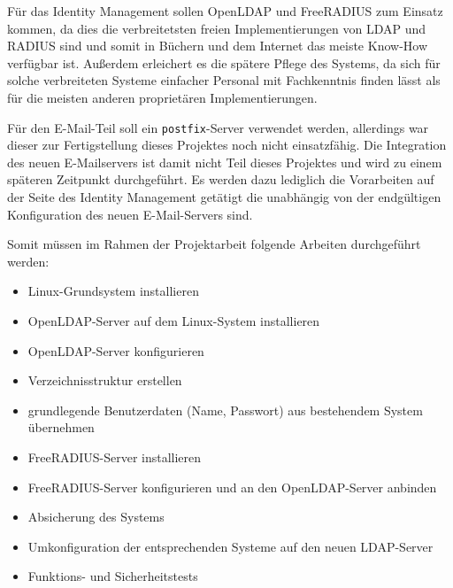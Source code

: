 \documentclass[11pt,a4paper,titlepage=firstiscover,headsepline,bibtotoc]{scrartcl} %
\begin{document}
Für das Identity Management sollen OpenLDAP und FreeRADIUS zum Einsatz kommen, da dies die verbreitetsten freien Implementierungen von LDAP und RADIUS sind und somit in Büchern und dem Internet das meiste Know-How verfügbar ist. Außerdem erleichert es die spätere Pflege des Systems, da sich für solche verbreiteten Systeme einfacher Personal mit Fachkenntnis finden lässt als für die meisten anderen proprietären Implementierungen.

Für den E-Mail-Teil soll ein \texttt{postfix}-Server verwendet werden, allerdings war dieser zur Fertigstellung dieses Projektes noch nicht einsatzfähig. Die Integration des neuen E-Mailservers ist damit nicht Teil dieses Projektes und wird zu einem späteren Zeitpunkt durchgeführt. Es werden dazu lediglich die Vorarbeiten auf der Seite des Identity Management getätigt die unabhängig von der endgültigen Konfiguration des neuen E-Mail-Servers sind.

\medskip \noindent 		%
Somit müssen im Rahmen der Projektarbeit folgende Arbeiten durchgeführt werden: 
\begin{itemize}
\item Linux-Grundsystem installieren
\item OpenLDAP-Server auf dem Linux-System installieren
\item OpenLDAP-Server konfigurieren
\item Verzeichnisstruktur erstellen
\item grundlegende Benutzerdaten (Name, Passwort) aus bestehendem System übernehmen
\item FreeRADIUS-Server installieren
\item FreeRADIUS-Server konfigurieren und an den OpenLDAP-Server anbinden
\item Absicherung des Systems
\item Umkonfiguration der entsprechenden Systeme auf den neuen LDAP-Server
\item Funktions- und Sicherheitstests
\end{itemize}
\end{document}
